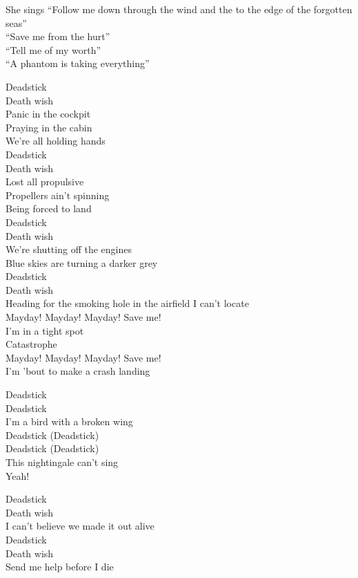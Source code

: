 She sings ``Follow me down through the wind and the  to the edge of the forgotten seas'' \\
``Save me from the hurt'' \\
``Tell me of my worth'' \\
``A phantom is taking everything'' \\


Deadstick \\
Death wish \\
Panic in the cockpit \\
Praying in the cabin \\
We're all holding hands \\
Deadstick \\
Death wish \\
Lost all propulsive \\
Propellers ain't spinning \\
Being forced to land \\
Deadstick \\
Death wish \\
We're shutting off the engines \\
Blue skies are turning a darker grey \\
Deadstick \\
Death wish \\
Heading for the smoking hole in the airfield I can't locate \\

Mayday! Mayday! Mayday! Save me! \\
I'm in a tight spot \\
Catastrophe \\
Mayday! Mayday! Mayday! Save me! \\
I'm 'bout to make a crash landing \\


Deadstick \\
Deadstick \\
I'm a bird with a broken wing \\
Deadstick (Deadstick) \\
Deadstick (Deadstick) \\
This nightingale can't sing \\
Yeah! \\


Deadstick \\
Death wish \\
I can't believe we made it out alive \\
Deadstick \\
Death wish \\
Send me help before I die \\

